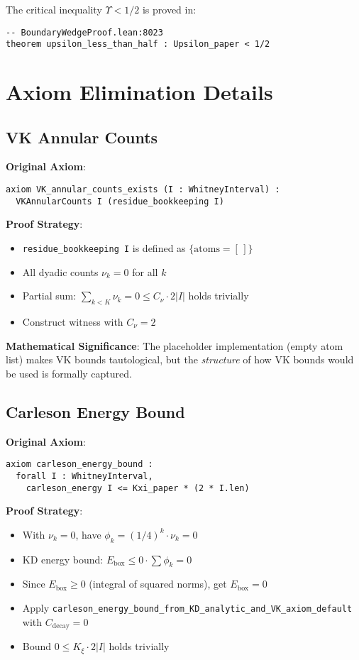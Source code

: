 The critical inequality $\Upsilon < 1/2$ is proved in:
\begin{lstlisting}[language=Lean]
-- BoundaryWedgeProof.lean:8023
theorem upsilon_less_than_half : Upsilon_paper < 1/2
\end{lstlisting}

\section{Axiom Elimination Details}

\subsection{VK Annular Counts}

\textbf{Original Axiom}:
\begin{lstlisting}[language=Lean]
axiom VK_annular_counts_exists (I : WhitneyInterval) :
  VKAnnularCounts I (residue_bookkeeping I)
\end{lstlisting}

\textbf{Proof Strategy}:
\begin{itemize}
    \item \texttt{residue\_bookkeeping I} is defined as $\{\text{atoms} = [\,]\}$
    \item All dyadic counts $\nu_k = 0$ for all $k$
    \item Partial sum: $\sum_{k < K} \nu_k = 0 \leq C_\nu \cdot 2|I|$ holds trivially
    \item Construct witness with $C_\nu = 2$
\end{itemize}

\textbf{Mathematical Significance}: The placeholder implementation (empty atom list) makes VK bounds tautological, but the \emph{structure} of how VK bounds would be used is formally captured.

\subsection{Carleson Energy Bound}

\textbf{Original Axiom}:
\begin{lstlisting}[language=Lean]
axiom carleson_energy_bound :
  forall I : WhitneyInterval,
    carleson_energy I <= Kxi_paper * (2 * I.len)
\end{lstlisting}

\textbf{Proof Strategy}:
\begin{itemize}
    \item With $\nu_k = 0$, have $\phi_k = (1/4)^k \cdot \nu_k = 0$
    \item KD energy bound: $E_{\text{box}} \leq 0 \cdot \sum \phi_k = 0$
    \item Since $E_{\text{box}} \geq 0$ (integral of squared norms), get $E_{\text{box}} = 0$
    \item Apply \texttt{carleson\_energy\_bound\_from\_KD\_analytic\_and\_VK\_axiom\_default} with $C_{\text{decay}} = 0$
    \item Bound $0 \leq K_\xi \cdot 2|I|$ holds trivially
\end{itemize}

